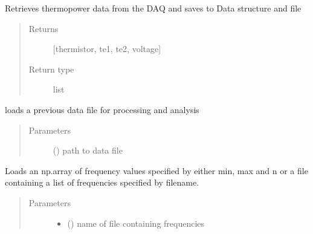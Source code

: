 \documentclass[letterpaper,10pt,english]{sphinxmanual}
\begin{document}
\begin{fulllineitems}

\begin{fulllineitems}
\label{\detokenize{laboratory:laboratory.Setup.get_thermopower}}
Retrieves thermopower data from the DAQ and saves to Data structure and file
\begin{quote}\begin{description}
\item[{Returns}] \leavevmode
{[}thermistor, te1, te2, voltage{]}

\item[{Return type}] \leavevmode
list

\end{description}\end{quote}

\end{fulllineitems}


\begin{fulllineitems}
\label{\detokenize{laboratory:laboratory.Setup.load_data}}
loads a previous data file for processing and analysis
\begin{quote}\begin{description}
\item[{Parameters}] \leavevmode
{} () \textendash{} path to data file

\end{description}\end{quote}

\end{fulllineitems}


\begin{fulllineitems}
\label{\detokenize{laboratory:laboratory.Setup.load_frequencies}}
Loads an np.array of frequency values specified by either min, max and n or a file containing a list of frequencies specified by filename.
\begin{quote}\begin{description}
\item[{Parameters}] \leavevmode\begin{itemize}
\item {} 
 () \textendash{} name of file containing frequencies


\end{itemize}
\end{description}
\end{quote}
\end{fulllineitems}
\end{fulllineitems}
\end{document}

